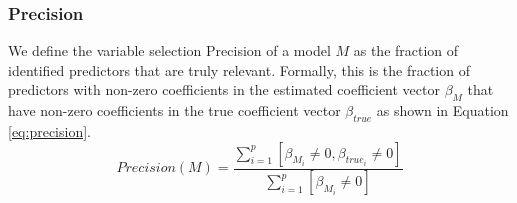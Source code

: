 \subsubsection{Precision}
We define the variable selection Precision of a model $M$ as the fraction of identified predictors that are truly relevant. Formally, this is the fraction of predictors with non-zero coefficients in the estimated coefficient vector $\beta_M$ that have non-zero coefficients in the true coefficient vector $\beta_{true}$ as shown in Equation \ref{eq:precision}. 
\begin{equation} \label{eq:precision}
Precision(M) = \frac{\sum_{i=1}^{p}[\beta_{M_i} \ne 0, \beta_{true_i} \ne 0]}{\sum_{i=1}^{p}[\beta_{M_i} \ne 0]}
\end{equation}

%
%
%
%
%


